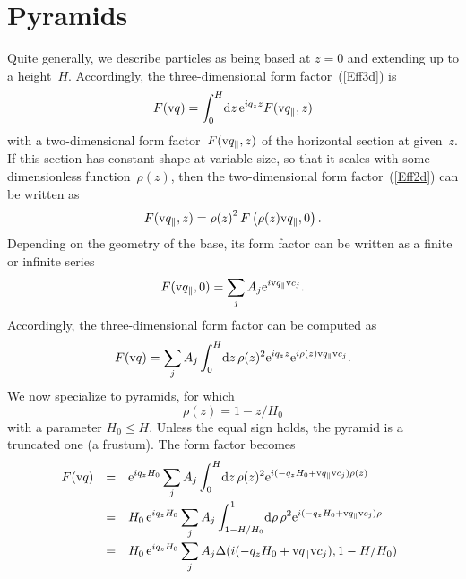 \section{Pyramids}

%
%
%
%

Quite generally, we describe particles
as being based at $z=0$ and extending up to a height~$H$.
Accordingly,
the three-dimensional form factor~(\ref{Eff3d}) is
\begin{equation}
  F(\text{v}{q}) = \int_0^H\!\text{d} z\,\text{e}^{iq_z z} F(\text{v}{q}_\parallel,z)
\end{equation}
with a two-dimensional form factor~$F(\text{v}{q}_\parallel,z)$
of the horizontal section at given~$z$.
If this section has constant shape at variable size,
so that it scales with some dimensionless function~$\rho(z)$,
then the two-dimensional form factor~(\ref{Eff2d})
can be written as
\begin{equation}
  F(\text{v}{q}_\parallel,z)
  = {\rho(z)}^2\, F\left(\rho(z)\text{v}{q}_\parallel,0\right).
\end{equation}
Depending on the geometry of the base,
its form factor can be written as a finite or infinite series
\begin{equation}
  F(\text{v}{q}_\parallel,0)=\sum_j A_j \text{e}^{i\text{v}{q}_\parallel \text{v}{c}_j}.
\end{equation}
Accordingly, the three-dimensional form factor can be computed as
\begin{equation}
  F(\text{v}{q}) = \sum_j A_j \int_0^H\!\text{d} z\,\rho(z)^2\text{e}^{iq_z z} \text{e}^{i\rho(z)\text{v}{q}_\parallel \text{v}{c}_j}.
\end{equation}
We now specialize to pyramids,
for which
\begin{equation}
  \rho(z) = 1-z/H_0
\end{equation}
with a parameter $H_0\le H$.
Unless the equal sign holds,
the pyramid is a truncated one (a frustum).
The form factor becomes
\begin{equation}
  \begin{array}{@{}lcl}
  F(\q)
  &=& \displaystyle
       \e^{iq_z H_0} \sum_j A_j \int_0^H\!\d z\,\rho(z)^2\e^{i(-q_zH_0 +\q_\parallel \v{c}_j)\rho(z)}
\\[3ex]
  &=& \displaystyle
       H_0\, \e^{iq_z H_0} \sum_j A_j \int_{1-H/H_0}^1\!\d\rho\, \rho^2\e^{i(-q_zH_0 +\q_\parallel \v{c}_j)\rho}
\\[3ex]
  &=& \displaystyle
       H_0\, \e^{iq_z H_0} \sum_j A_j \Delta(i(-q_zH_0 +\q_\parallel \v{c}_j),1-H/H_0)
  \end{array}
\end{equation}
